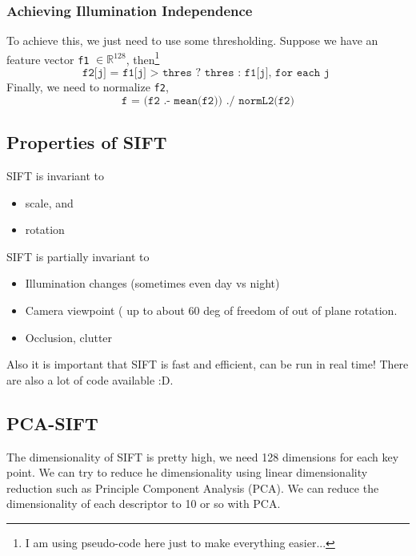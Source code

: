 \documentclass[11pt]{article}
\newcommand{\real}{\mathbb{R}}
\begin{document}
\subsubsection{Achieving Illumination Independence} To achieve this, we just need to use some thresholding. Suppose we have an feature vector \texttt{f1} $\in \real^{128}$, then\footnote{I am using pseudo-code here just to make everything easier... }
\begin{equation}
	\texttt{f2[j] = f1[j] > thres ? thres : f1[j], for each j }
\end{equation}
Finally, we need to normalize \texttt{f2}, 
\begin{equation}
	\texttt{f = (f2 .- mean(f2)) ./ normL2(f2)}
\end{equation}

\subsection{Properties of SIFT}
SIFT is invariant to
\begin{itemize}
	\item scale, and 
	\item rotation
\end{itemize}
SIFT is partially invariant to 
\begin{itemize}
	\item Illumination changes (sometimes even day vs night) 
	\item Camera viewpoint ( up to about 60 deg of freedom of out of plane rotation.  
	\item Occlusion, clutter 
\end{itemize}
Also it is important that SIFT is fast and efficient, can be run in real time! There are also a lot of code available :D. 


\subsection{PCA-SIFT} 
The dimensionality of SIFT is pretty high, we need 128 dimensions for each key point. We can try to reduce he dimensionality using linear dimensionality reduction such as Principle Component Analysis (PCA). We can reduce the dimensionality of each descriptor to 10 or so with PCA. 
\end{document}
